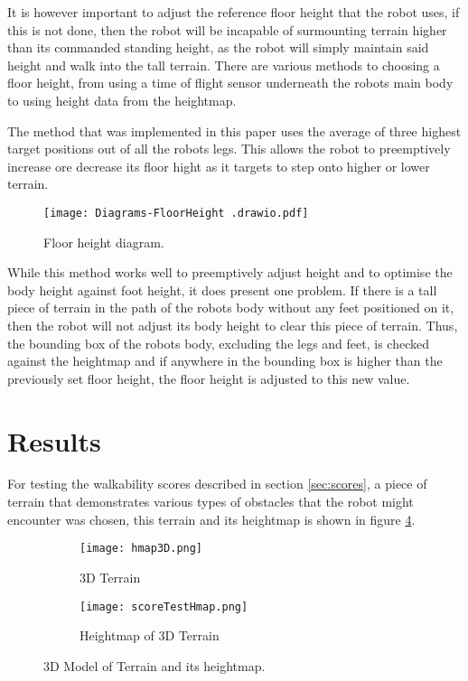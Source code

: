     It is however important to adjust the reference floor height that the robot uses, if this is not done, then the robot will be
    incapable of surmounting terrain higher than its commanded standing height, as the robot will simply maintain said height and walk into the tall terrain.
    There are various methods to choosing a floor height, from using 
    a time of flight sensor underneath the robots main body to using height data from the heightmap.

    The method that was implemented in this paper uses the average of three highest target positions out of all the robots legs.
    This allows the robot to preemptively increase ore decrease its floor hight as it targets to step onto higher or lower terrain.

    \begin{figure}[h]
        \centering
        \texttt{[image: Diagrams-FloorHeight .drawio.pdf]}
        \caption{Floor height diagram.}
        \label{fig:floor_height}
    \end{figure}

    While this method works well to preemptively adjust height and to optimise the body height against foot height, it does present one problem. If there is a tall piece of terrain in the path of the robots body
    without any feet positioned on it, then the robot will not adjust its body height to clear this piece of terrain. 
    Thus, the bounding box of the robots body, excluding the legs and feet, is checked against the heightmap
    and if anywhere in the bounding box is higher than the previously set floor height, the floor height is adjusted to this new value.

    \newpage
    \section{Results} \label{sec:test_scores}
    For testing the walkability scores described in section \ref{sec:scores}, a piece of terrain that demonstrates various types of obstacles
    that the robot might encounter was chosen, this terrain and its heightmap is shown in figure \ref{fig:score_test_map}.
    \begin{figure}[h]
        \centering
        \begin{subfigure}{.5\textwidth}
            \texttt{[image: hmap3D.png]}
            \caption{3D Terrain}
            \label{fig:sub_3d_terrain}
        \end{subfigure}%
        \begin{subfigure}{.5\textwidth}
            \texttt{[image: scoreTestHmap.png]}
            \caption{Heightmap of 3D Terrain}
            \label{fig:sub_3d_terrain_hmap}
        \end{subfigure}
        \caption{3D Model of Terrain and its heightmap.}
        \label{fig:score_test_map}
    \end{figure}

